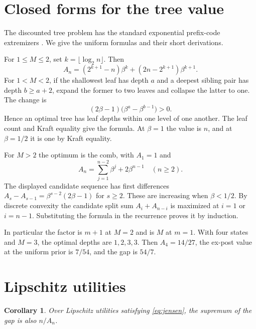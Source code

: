 \documentclass[11pt,a4paper]{amsart}
\newtheorem{corollary}[theorem]{Corollary}
\begin{document}
\section{Closed forms for the tree value}

The discounted tree problem has the standard exponential prefix-code extremizers \cite{baer,parker}. We give the uniform formulas and their short derivations.

For \(1\le M\le2\), set \(k=\lfloor\log_2 n\rfloor\). Then
\[
 A_n=(2^{k+1}-n)\beta^k+(2n-2^{k+1})\beta^{k+1}.
\]
For \(1<M<2\), if the shallowest leaf has depth \(a\) and a deepest sibling pair has depth \(b\ge a+2\), expand the former to two leaves and collapse the latter to one. The change is
\[
 (2\beta-1)\bigl(\beta^a-\beta^{b-1}\bigr)>0.
\]
Hence an optimal tree has leaf depths within one level of one another. The leaf count and Kraft equality give the formula. At \(\beta=1\) the value is \(n\), and at \(\beta=1/2\) it is one by Kraft equality.

For \(M>2\) the optimum is the comb, with \(A_1=1\) and
\[
 A_n=\sum_{j=1}^{n-2}\beta^j+2\beta^{n-1}\quad(n\ge2).
\]
The displayed candidate sequence has first differences \(A_s-A_{s-1}=\beta^{s-2}(2\beta-1)\) for \(s\ge2\). These are increasing when \(\beta<1/2\). By discrete convexity the candidate split sum \(A_i+A_{n-i}\) is maximized at \(i=1\) or \(i=n-1\). Substituting the formula in the recurrence proves it by induction.

In particular the factor is \(m+1\) at \(M=2\) and is \(M\) at \(m=1\). With four states and \(M=3\), the optimal depths are \(1,2,3,3\). Then \(A_4=14/27\), the ex-post value at the uniform prior is \(7/54\), and the gap is \(54/7\).

\section{Lipschitz utilities}

\begin{corollary}\label{cor:lip}
Over Lipschitz utilities satisfying \eqref{eq:jensen}, the supremum of the gap is also \(n/A_n\).
\end{corollary}
\end{document}

